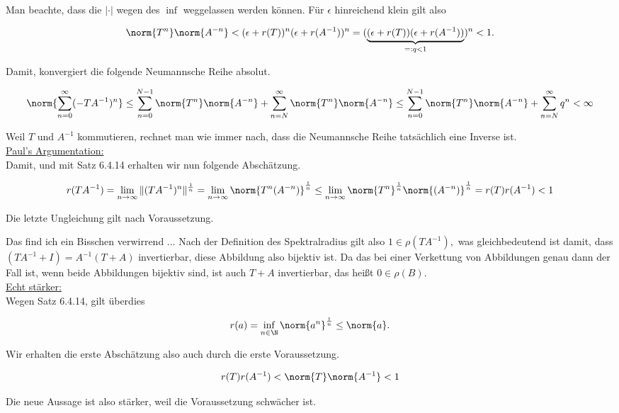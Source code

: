 \begin{solution}
Man beachte, dass die $|\cdot|$ wegen des $\inf$ weggelassen werden können.
Für $\epsilon$ hinreichend klein gilt also

\begin{align*}
  \norm{T^n} \norm{A^{-n}}
  <
  (\epsilon + r(T))^n
  (\epsilon + r(A^{-1}))^n
  =
  (
    \underbrace
    {
      (\epsilon + r(T))
      (\epsilon + r(A^{-1}))
    }_{=: q < 1}
  )^n < 1.
\end{align*}

Damit, konvergiert die folgende Neumannsche Reihe absolut.

\begin{align*}
  \norm{\sum_{n = 0}^\infty (-T A^{-1})^n}
  \leq
  \sum_{n = 0}^{N-1} \norm{T^n} \norm{A^{-n}} +
  \sum_{n = N}^\infty \norm{T^n} \norm{A^{-n}}
  \leq
  \sum_{n = 0}^{N-1} \norm{T^n} \norm{A^{-n}} +
  \sum_{n = N}^\infty q^n
  < \infty
\end{align*}

Weil $T$ und $A^{-1}$ kommutieren, rechnet man wie immer nach, dass die Neumannsche Reihe tatsächlich eine Inverse ist. \\

\underline{Paul's Argumentation:} \\

Damit, und mit Satz 6.4.14 erhalten wir nun folgende Abschätzung.

\begin{align*}
    r(TA^{-1})
    =
    \lim_{n \to \infty}{\|(TA^{-1})^n\|^{\frac{1}{n}}}
    =
    \lim_{n \to \infty}
    \norm{T^n(A^{-n})}^\frac{1}{n}
    \leq
    \lim_{n \to \infty}
    \norm{T^n}^\frac{1}{n}
    \norm{(A^{-n})}^\frac{1}{n}
    =
    r(T) r(A^{-1}) < 1
\end{align*}

Die letzte Ungleichung gilt nach Voraussetzung.


Das find ich ein Bisschen verwirrend ...
Nach der Definition des Spektralradius gilt also $1 \in \rho(TA^{-1}),$ was gleichbedeutend ist damit, dass $(TA^{-1} + I) = A^{-1} (T + A)$ invertierbar, diese Abbildung also bijektiv ist. Da das bei einer Verkettung von Abbildungen genau dann der Fall ist, wenn beide Abbildungen bijektiv sind, ist auch $T + A$ invertierbar, das heißt $0 \in \rho(B).$ \\

\underline{Echt stärker:} \\

Wegen Satz 6.4.14, gilt überdies

\begin{align*}
  r(a)
  =
  \inf_{n \in \N}
  \norm{a^n}^\frac{1}{n}
  \leq
  \norm{a}.
\end{align*}

Wir erhalten die erste Abschätzung also auch durch die erste Voraussetzung.

\begin{align*}
  r(T) r(A^{-1})
  <
  \norm{T} \norm{A^{-1}} < 1
\end{align*}

Die neue Aussage ist also stärker, weil die Voraussetzung schwächer ist.

\end{solution}
